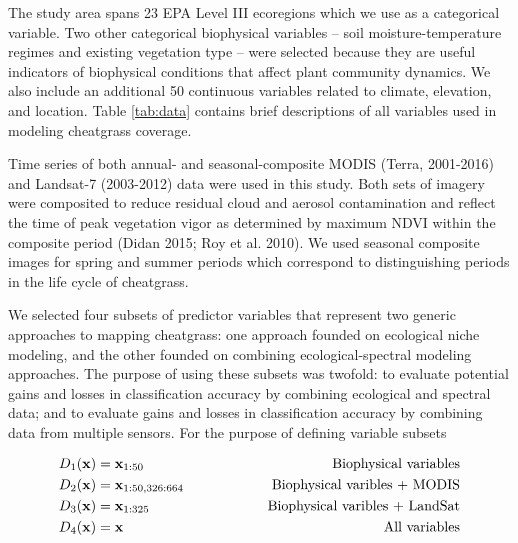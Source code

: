 \documentclass{article} %
\begin{document}
The study area spans 23 EPA Level III ecoregions which we use as a categorical variable. Two other categorical biophysical variables – soil moisture-temperature regimes and existing vegetation type – were selected because they are useful indicators of biophysical conditions that affect plant community dynamics. We also include an additional 50 continuous variables related to climate, elevation, and location.  Table \ref{tab:data} contains brief descriptions of all variables used in modeling cheatgrass coverage. 

Time series of both annual- and seasonal-composite MODIS (Terra, 2001-2016) and Landsat-7 (2003-2012) data were used in this study. 
Both sets of imagery were composited to reduce residual cloud and aerosol contamination and reflect the time of peak vegetation vigor as determined by maximum NDVI within the composite period (Didan 2015; Roy et al. 2010). 
We used seasonal composite images for spring and summer periods which correspond to distinguishing periods in the life cycle of cheatgrass. %

We selected four subsets of predictor variables that represent two generic approaches to mapping cheatgrass: one approach founded on ecological niche modeling, and the other founded on combining ecological-spectral modeling approaches. The purpose of using these subsets was twofold: to evaluate potential gains and losses in classification accuracy by combining ecological and spectral data; and to evaluate gains and losses in classification accuracy by combining data from multiple sensors. For the purpose of defining variable subsets

\begin{eqnarray}\label{eqn:subset}
D_1({\bf x}) &= {\bf x}_{1:50}\hspace{50pt}&\textrm{Biophysical variables}\\
D_2({\bf x})  &= {\bf x}_{1:50,326:664}\hspace{50pt}&\textrm{Biophysical varibles + MODIS}\\
D_3({\bf x})  &= {\bf x}_{1:325}\hspace{50pt}&\textrm{Biophysical varibles + LandSat}\\
D_4({\bf x}) &= {\bf x}\hspace{50pt}&\textrm{All variables}\\\label{eqn:subset2}
\end{eqnarray}

\end{document}
